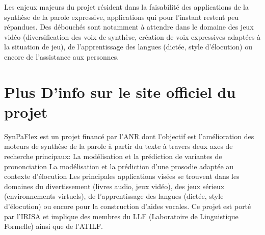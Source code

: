 \documentclass[12pt,a4paper]{article}
\begin{document}
Les enjeux majeurs du projet résident dans la faisabilité des applications de la synthèse de la parole expressive, applications qui pour l’instant restent peu répandues. Des débouchés sont notamment à attendre dans le domaine des jeux vidéo (diversification des voix de synthèse, création de voix expressives adaptées à la situation de jeu), de l’apprentissage des langues (dictée, style d’élocution) ou encore de l’assistance aux personnes. 

\section{Plus D'info sur le site officiel du projet}
SynPaFlex est un projet financé par l’ANR dont l’objectif est l’amélioration des moteurs de synthèse de la parole à partir du texte à travers deux axes de recherche principaux:
La modélisation et la prédiction de variantes de prononciation
La modélisation et la prédiction d’une prosodie adaptée au contexte d’élocution
Les principales applications visées se trouvent dans les domaines du divertissement (livres audio, jeux vidéo), des jeux sérieux (environnements virtuels), de l’apprentissage des langues (dictée, style d’élocution) ou encore pour la construction d’aides vocales.
Ce projet est porté par l’IRISA et implique des membres du LLF (Laboratoire de Linguistique Formelle) ainsi que de l’ATILF.
\end{document}
